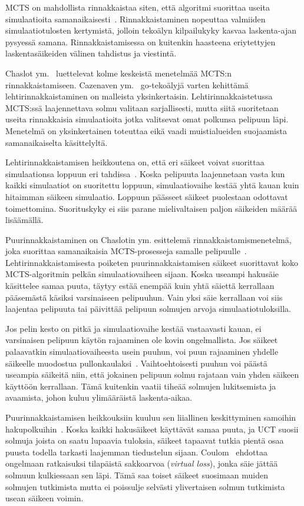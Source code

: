 \documentclass[12pt,finnish]{tktltiki2}
\theoremstyle{definition}
\theoremstyle{remark}
\begin{document}
MCTS on mahdollista rinnakkaistaa siten, että algoritmi suorittaa useita simulaatioita samanaikaisesti~\cite{browne, cazenave}. Rinnakkaistaminen nopeuttaa valmiiden simulaatiotulosten kertymistä, jolloin tekoälyn kilpailukyky kasvaa laskenta-ajan pysyessä samana. Rinnakkaistamisessa on kuitenkin haasteena eriytettyjen laskentasäikeiden välinen tahdistus ja viestintä.

Chaslot ym.~\cite{chaslot} luettelevat kolme keskeistä menetelmää MCTS:n rinnakkaistamiseen. Cazenaven ym.~\cite{cazenave} go-tekoälyjä varten kehittämä lehtirinnakkaistaminen on malleista yksinkertaisin. Lehtirinnakkaistetussa MCTS:ssä laajennettava solmu valitaan sarjallisesti, mutta siitä suoritetaan useita rinnakkaisia simulaatioita jotka valitsevat omat polkunsa pelipuun läpi. Menetelmä on yksinkertainen toteuttaa eikä vaadi muistialueiden suojaamista samanaikaiselta käsittelyltä.

Lehtirinnakkaistamisen heikkoutena on, että eri säikeet voivat suorittaa simulaationsa loppuun eri tahdissa~\cite{chaslot}. Koska pelipuuta laajennetaan vasta kun kaikki simulaatiot on suoritettu loppuun, simulaatiovaihe kestää yhtä kauan kuin hitaimman säikeen simulaatio. Loppuun päässeet säikeet puolestaan odottavat toimettomina. Suorituskyky ei siis parane mielivaltaisen paljon säikeiden määrää lisäämällä.

Puurinnakkaistaminen on Chaslotin ym. esittelemä rinnakkaistamismenetelmä, joka suorittaa samanaikaisia MCTS-prosesseja samalle pelipuulle~\cite{chaslot}. Lehtirinnakkaistamisesta poiketen puurinnakkaistamisen säikeet suorittavat koko MCTS-algoritmin pelkän simulaatiovaiheen sijaan. Koska useampi hakusäie käsittelee samaa puuta, täytyy estää enempää kuin yhtä säiettä kerrallaan pääsemästä käsiksi varsinaiseen pelipuuhun. Vain yksi säie kerrallaan voi siis laajentaa pelipuuta tai päivittää pelipuun solmujen arvoja simulaatiotuloksilla.

Jos pelin kesto on pitkä ja simulaatiovaihe kestää vastaavasti kauan, ei varsinaisen pelipuun käytön rajaaminen ole kovin ongelmallista. Jos säikeet palaavatkin simulaatiovaiheesta usein puuhun, voi puun rajaaminen yhdelle säikeelle muodostua pullonkaulaksi~\cite{chaslot}. Vaihtoehtoisesti puuhun voi päästä useampia säikeitä niin, että jokainen pelipuun solmu rajataan vain yhden säikeen käyttöön kerrallaan. Tämä kuitenkin vaatii tiheää solmujen lukitsemista ja avaamista, johon kuluu ylimääräistä laskenta-aikaa.

Puurinnakkaistamisen heikkouksiin kuuluu sen liiallinen keskittyminen samoihin hakupolkuihin~\cite{browne, chaslot}. Koska kaikki hakusäikeet käyttävät samaa puuta, ja UCT suosii solmuja joista on saatu lupaavia tuloksia, säikeet tapaavat tutkia pientä osaa puusta todella tarkasti laajemman tiedustelun sijaan. Coulom~\cite{chaslot} ehdottaa ongelmaan ratkaisuksi tilapäistä sakkoarvoa (\textit{virtual loss}), jonka säie jättää solmuun kulkiessaan sen läpi. Tämä saa toiset säikeet suosimaan muiden solmujen tutkimista mutta ei poissulje selvästi ylivertaisen solmun tutkimista usean säikeen voimin.
\end{document}
